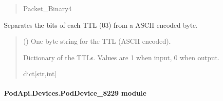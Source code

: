 \documentclass[letterpaper,10pt,english]{sphinxmanual}
\begin{document}
\begin{fulllineitems}
\begin{fulllineitems}
\begin{quote}
\begin{description}
\sphinxAtStartPar
Packet\_Binary4

\end{description}\end{quote}

\end{fulllineitems}


\begin{fulllineitems}
\label{\detokenize{PodApi.Devices:PodApi.Devices.PodDevice_8206HR.Pod8206HR._TranslateTTLbyte_ASCII}}
\pysigstartsignatures
{}
\pysigstopsignatures
\sphinxAtStartPar
Separates the bits of each TTL (0\sphinxhyphen{}3) from a ASCII encoded byte.
\begin{quote}\begin{description}
\sphinxAtStartPar
{} () \textendash{} One byte string for the TTL (ASCII encoded).

\sphinxAtStartPar
Dictionary of the TTLs. Values are 1 when input, 0 when output.

\sphinxAtStartPar
dict{[}str,int{]}

\end{description}\end{quote}

\end{fulllineitems}


\end{fulllineitems}



\paragraph{PodApi.Devices.PodDevice\_8229 module}
\label{\detokenize{PodApi.Devices:module-PodApi.Devices.PodDevice_8229}}\label{\detokenize{PodApi.Devices:podapi-devices-poddevice-8229-module}}
\end{document}
